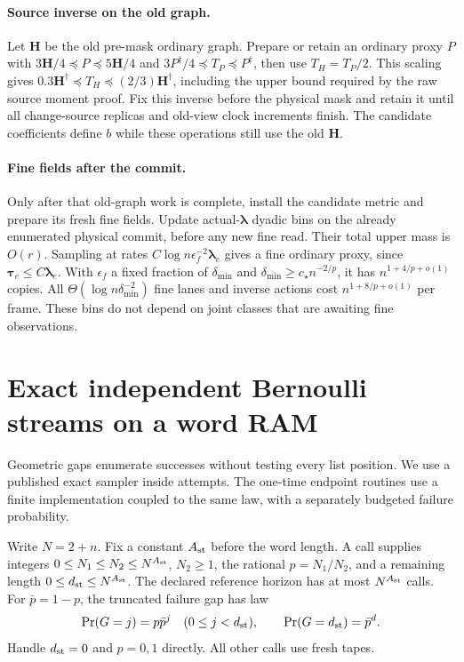 \documentclass[11pt]{article}
\theoremstyle{remark}
\newcommand{\HH}{\mathbf H}
\newcommand{\llambda}{\boldsymbol{\lambda}}
\newcommand{\ttau}{\boldsymbol{\tau}}
\begin{document}
\paragraph{Source inverse on the old graph.}
Let $\HH$ be the old pre-mask ordinary graph.
Prepare or retain an ordinary proxy $P$ with $3\HH/4\preceq P\preceq5\HH/4$ and
$3P^\dagger/4\preceq T_P\preceq P^\dagger$, then use $T_H=T_P/2$.
This scaling gives $0.3\HH^\dagger\preceq T_H\preceq(2/3)\HH^\dagger$, including the
upper bound required by the raw source moment proof.
Fix this inverse before the physical mask and retain it until all change-source
replicas and old-view clock increments finish.
The candidate coefficients define $b$ while these operations still use the old
$\HH$.

\paragraph{Fine fields after the commit.}
Only after that old-graph work is complete, install the candidate metric and
prepare its fresh fine fields.
Update actual-$\llambda$ dyadic bins on the already enumerated physical commit,
before any new fine read.
Their total upper mass is $O(r)$.
Sampling at rates $C\log n\epsilon_f^{-2}\llambda_e$ gives a fine ordinary proxy,
since $\ttau_e\le C\llambda_e$.
With $\epsilon_f$ a fixed fraction of $\delta_{\min}$ and $\delta_{\min}\ge c_\star
n^{-2/p}$, it has $n^{1+4/p+o(1)}$ copies.
All $\Theta(\log n\delta_{\min}^{-2})$ fine lanes and inverse actions cost
$n^{1+8/p+o(1)}$ per frame.
These bins do not depend on joint classes that are awaiting fine observations.

\section{Exact independent Bernoulli streams on a word RAM}
\label{sec:ram-exact-streams}

Geometric gaps enumerate successes without testing every list position.
We use a published exact sampler inside attempts.
The one-time endpoint routines use a finite implementation coupled to the same
law, with a separately budgeted failure probability.

Write $N=2+n$.
Fix a constant $A_{\rm st}$ before the word length.
A call supplies integers $0\le N_1\le N_2\le N^{A_{\rm st}}$, $N_2\ge1$, the rational $p=N_1/N_2$,
and a remaining length $0\le d_{\rm st}\le N^{A_{\rm st}}$.
The declared reference horizon has at most $N^{A_{\rm st}}$ calls.
For $\bar p=1-p$, the truncated failure gap has law
\[
 \Pr(G=j)=p \bar p^j\quad(0\le j<d_{\rm st}),\qquad
 \Pr(G=d_{\rm st})=\bar p^d.
\]
Handle $d_{\rm st}=0$ and $p=0,1$ directly.
All other calls use fresh tapes.
\end{document}
